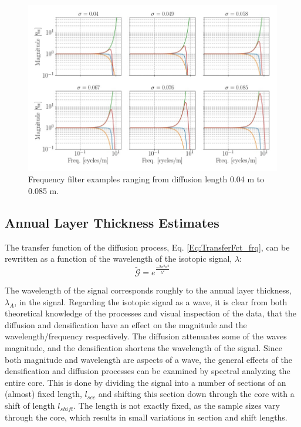 \documentclass[../../CompleteThesis2/Complete_2ndDraft]{subfiles}
\begin{document}
\begin{figure}[h]
	\centering
	\includegraphics[width=\textwidth]{SiteA_filtersEx.jpg}
	\caption[Frequency filters example, Site A]{\small Frequency filter examples ranging from diffusion length 0.04 m to 0.085 m.}
	\label{fig:SiteA_filtersEx}
\end{figure}


\subsection[ALT from Spectral Analysis]{Annual Layer Thickness Estimates}
\label{Subsubsec:SignalAnalysis_SpectralAnalysis_ALT}

The transfer function of the diffusion process, Eq. \ref{Eq:TransferFct_frq}, can be rewritten as a function of the wavelength of the isotopic signal, $\lambda$:
\begin{equation}
	\tilde{\mathcal{G}} = e^{\frac{-2\pi^2\sigma^2}{\lambda^2}}
	\label{Eq:TransferFct_lambda}
\end{equation}

The wavelength of the signal corresponds roughly to the annual layer thickness, $\lambda_A$, in the signal. Regarding the isotopic signal as a wave, it is clear from both theoretical knowledge of the processes and visual inspection of the data, that the diffusion and densification have an effect on the magnitude and the wavelength/frequency respectively. The diffusion attenuates some of the waves magnitude, and the densification shortens the wavelength of the signal. Since both magnitude and wavelength are aspects of a wave, the general effects of the densification and diffusion processes can be examined by spectral analyzing the entire core. This is done by dividing the signal into a number of sections of an (almost) fixed length, $l_{sec}$ and shifting this section down through the core with a shift of length $l_{shift}$. The length is not exactly fixed, as the sample sizes vary through the core, which results in small variations in section and shift lengths.
\end{document}

